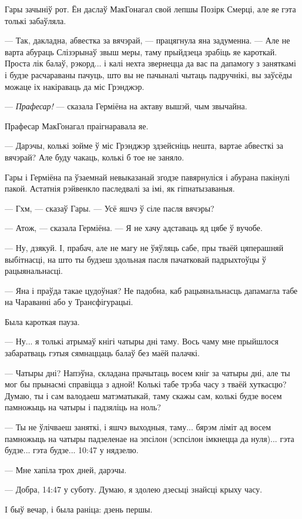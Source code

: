 Гары зачыніў рот. Ён даслаў МакГонагал свой лепшы Позірк Смерці, але яе гэта толькі 
забаўляла.

--- Так, дакладна, абвестка за вячэрай, --- працягнула яна задуменна. --- Але не варта абураць 
Слізэрынаў звыш меры, таму прыйдзеца зрабіць яе кароткай. Проста лік балаў, рэкорд...
і калі нехта звернецца да вас па дапамогу з заняткамі і будзе расчараваны пачуць,
што вы не пачыналі чытаць падручнікі, вы заўсёды можаце іх накіраваць да міс Грэнджэр.

--- \emph{Прафесар!} --- сказала Герміёна на актаву вышэй, чым звычайна.

Прафесар МакГонагал праігнаравала яе.

--- Дарэчы, колькі зойме ў міс Грэнджэр здзейсніць нешта, вартае абвесткі за вячэрай?
Але буду чакаць, колькі б тое не заняло.

Гары і Герміёна па ўзаемнай невыказанай згодзе павярнуліся і абурана пакінулі пакой.
Астатнія рэйвенкло паследвалі за імі, як гіпнатызаваныя.

--- Гхм, --- сказаў Гары. --- Усё яшчэ ў сіле пасля вячэры?

--- Атож, --- сказала Герміёна. --- Я не хачу адставаць яд цябе ў вучобе.

--- Ну, дзякуй. І, прабач, але не магу не ўяўляць сабе, пры тваёй цяперашняй 
выбітнасці, на што ты будзеш здольная пасля пачатковай падрыхтоўцы ў рацыянальнасці.

--- Яна і праўда такае цудоўная? Не падобна, каб рацыянальнасць дапамагла табе на 
Чараванні або у Трансфігурацыі.

Была кароткая пауза.

--- Ну... я толькі атрымаў кнігі чатыры дні таму. Вось чаму мне прыйшлося забаратваць гэтыя сямнаццаць 
балаў без маёй палачкі.

--- Чатыры дні? Напэўна, складана прачытаць восем кніг за чатыры дні, але ты мог 
бы прынасмі справіцца з адной! Колькі табе трэба часу з тваёй хуткасцю?
Думаю, ты і сам валодаеш матэматыкай, таму скажы сам, колькі будзе
восем памножыць на чатыры і падзяліць на ноль?

--- Ты не ўлічваеш заняткі, і яшчэ выходныя, таму... бярэм ліміт ад 
восем памножыць на чатыры падзеленае на эпсілон (эспсілон імкнецца да нуля)...
гэта будзе... гэта будзе... 10:47 у нядзелю. 

--- Мне хапіла трох дней, дарэчы.

--- Добра, 14:47 у суботу. Думаю, я здолею дзесьці знайсці крыху часу.

I быў вечар, і была раніца: дзень першы.
